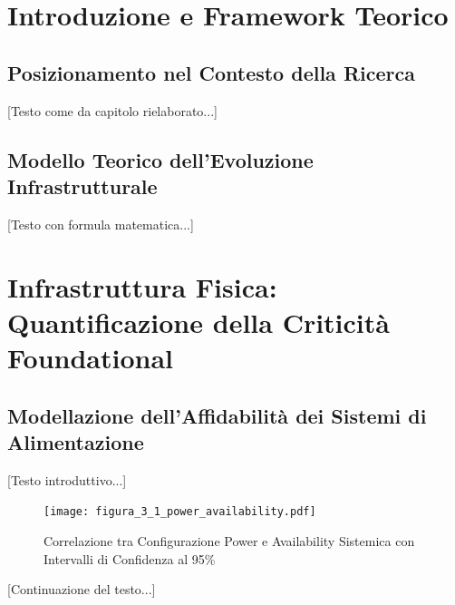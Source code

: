 \section{Introduzione e Framework Teorico}

\subsection{Posizionamento nel Contesto della Ricerca}

[Testo come da capitolo rielaborato...]

\subsection{Modello Teorico dell'Evoluzione Infrastrutturale}

[Testo con formula matematica...]

\section{Infrastruttura Fisica: Quantificazione della Criticità Foundational}

\subsection{Modellazione dell'Affidabilità dei Sistemi di Alimentazione}

[Testo introduttivo...]

\begin{figure}[htbp]
\centering
\texttt{[image: figura\_3\_1\_power\_availability.pdf]}
\caption{Correlazione tra Configurazione Power e Availability Sistemica con Intervalli di Confidenza al 95\%}
\label{fig:power_availability}
\end{figure}

[Continuazione del testo...]

